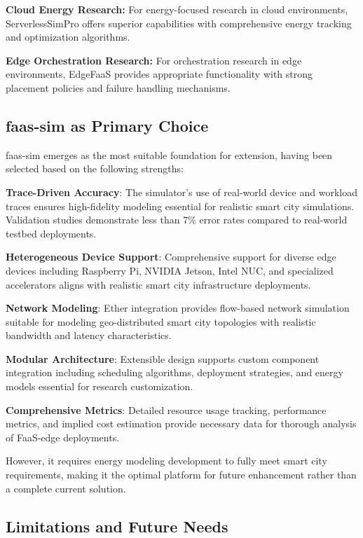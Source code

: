 \textbf{Cloud Energy Research:} For energy-focused research in cloud environments, ServerlessSimPro offers superior capabilities with comprehensive energy tracking and optimization algorithms.

\textbf{Edge Orchestration Research:} For orchestration research in edge environments, EdgeFaaS provides appropriate functionality with strong placement policies and failure handling mechanisms.

\subsection{faas-sim as Primary Choice}

faas-sim emerges as the most suitable foundation for extension, having been selected based on the following strengths:

\textbf{Trace-Driven Accuracy}: The simulator's use of real-world device and workload traces ensures high-fidelity modeling essential for realistic smart city simulations. Validation studies demonstrate less than 7\% error rates compared to real-world testbed deployments.

\textbf{Heterogeneous Device Support}: Comprehensive support for diverse edge devices including Raspberry Pi, NVIDIA Jetson, Intel NUC, and specialized accelerators aligns with realistic smart city infrastructure deployments.

\textbf{Network Modeling}: Ether \cite{rausch2020ether}  integration provides flow-based network simulation suitable for modeling geo-distributed smart city topologies with realistic bandwidth and latency characteristics.

\textbf{Modular Architecture}: Extensible design supports custom component integration including scheduling algorithms, deployment strategies, and energy models essential for research customization.

\textbf{Comprehensive Metrics}: Detailed resource usage tracking, performance metrics, and implied cost estimation provide necessary data for thorough analysis of FaaS-edge deployments.

However, it requires energy modeling development to fully meet smart city requirements, making it the optimal platform for future enhancement rather than a complete current solution.

\subsection{Limitations and Future Needs}

